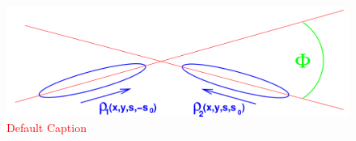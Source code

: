 \begin{figure}
\begin{center}
\includegraphics[width=\linewidth,height=\textheight,keepaspectratio]{../HourglassCorrection/figs/xing_bunch}
\caption{ \textcolor{red}{Default Caption} }
\label{fig:xing_bunch}
\end{center}
\end{figure}